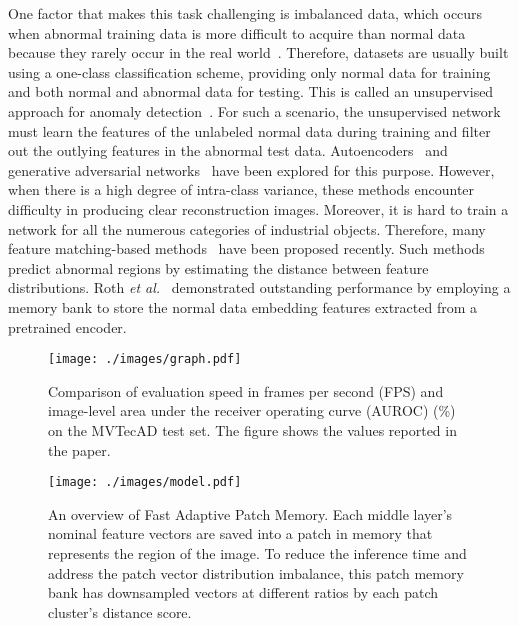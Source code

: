 \documentclass{article}
\begin{document}
    
    One factor that makes this task challenging is imbalanced data, which occurs when abnormal training data is more difficult to acquire than normal data because they rarely occur in the real world~\cite{survey,survey2}. Therefore, datasets are usually built using a one-class classification scheme, providing only normal data for training and both normal and abnormal data for testing. This is called an unsupervised approach for anomaly detection~\cite{survey2}. For such a scenario, the unsupervised network must learn the features of the unlabeled normal data during training and filter out the outlying features in the abnormal test data. Autoencoders~\cite{itad,AE,trustmae} and generative adversarial networks~\cite{gan, itad,mvtec,vevae, hou2021divide} have been explored for this purpose. However, when there is a high degree of intra-class variance, these methods encounter difficulty in producing clear reconstruction images. Moreover, it is hard to train a network for all the numerous categories of industrial objects. Therefore, many feature matching-based methods~\cite{Padim,patchcore,SPADE,STPM} have been proposed recently. Such methods~\cite{Padim,SPADE} predict abnormal regions by estimating the distance between feature distributions. Roth \textit{et al.}~\cite{patchcore} demonstrated outstanding performance by employing a memory bank to store the normal data embedding features extracted from a pretrained encoder.
    
    	\begin{figure}[!t]
		\begin{center}
			\texttt{[image: ./images/graph.pdf]}
		\end{center}
		\vspace{-0.6cm}
		\caption{Comparison of evaluation speed in frames per second (FPS) and image-level area under the receiver operating curve (AUROC) (\%) on the MVTecAD test set. The figure shows the values reported in the paper.}
  \vspace{-0.15cm}
		\label{speed}
	\end{figure}
	
    \begin{figure*}[!ht]
		\begin{center}
			\texttt{[image: ./images/model.pdf]}
		\end{center}
		\vspace{-0.8cm}
		\caption{An overview of Fast Adaptive Patch Memory. Each middle layer’s nominal feature vectors are saved into a patch in memory that represents the region of the image. To reduce the inference time and address the patch vector distribution imbalance, this patch memory bank has downsampled vectors at different ratios by each patch cluster’s distance score.}
        \vspace{-0.55cm}
		\label{architecture}
	\end{figure*}
\end{document}
